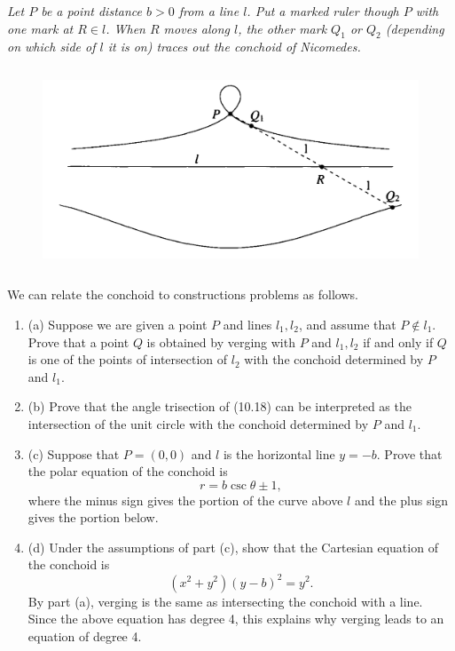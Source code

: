 \documentclass[11pt,a4paper]{article}
\newcommand{\be} {\begin{enumerate}}
\newcommand{\ee} {\end{enumerate}}
\begin{document}
{\it Let $P$ be a point distance $b>0$ from a line $l$. Put a marked ruler though $P$ with one mark at $R \in l$. When $R$ moves along $l$, the other mark $Q_1$ or $Q_2$ (depending on which side of $l$ it is on) traces out the conchoid of Nicomedes.

\begin{figure}[htbp]
\begin{center}
\includegraphics [width=12cm,height=6cm] {Ex.10.3.16.png}
\end{center}
\end{figure}

We can relate the conchoid to constructions problems as follows.
\be
\item[(a)] Suppose we are given a point $P$ and lines $l_1,l_2$, and assume that $P \not \in l_1$. Prove that a point $Q$ is obtained by verging with $P$ and $l_1,l_2$ if and only if $Q$ is one of the points of intersection of $l_2$ with the conchoid determined by $P$ and $l_1$.
\item[(b)] Prove that the angle trisection of (10.18) can be interpreted as the intersection of the unit circle with the conchoid determined by $P$ and $l_1$.

\item[(c)] Suppose that $P = (0,0)$ and $l$ is the horizontal line $y=-b$. Prove that the polar equation of the conchoid is
$$r = b \csc \theta \pm 1,$$
where the minus sign gives the portion of the curve above $l$ and the plus sign gives the portion below.
\item[(d)] Under the assumptions of part (c), show that the Cartesian equation of the conchoid is
$$(x^2+y^2)(y-b)^2 = y^2.$$
By part (a), verging is the same as intersecting the conchoid with a line. Since the above equation has degree 4, this explains why verging leads to an equation of degree 4.
\ee
}
\end{document}

